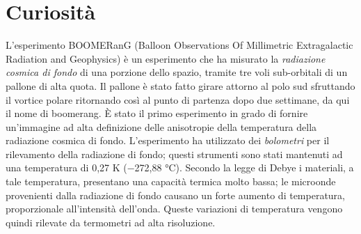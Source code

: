 \documentclass[12pt,a4paper]{article}
\begin{document}
\section*{Curiosità}
\label{curiosit}

L'esperimento BOOMERanG (Balloon Observations Of Millimetric Extragalactic Radiation and Geophysics) è un esperimento che ha misurato la \emph{radiazione cosmica di fondo} di una porzione dello spazio, tramite tre voli sub-orbitali di un pallone di alta quota. Il pallone è stato fatto girare attorno al polo sud sfruttando il vortice polare ritornando così al punto di partenza dopo due settimane, da qui il nome di boomerang.
È stato il primo esperimento in grado di fornire un'immagine ad alta definizione delle anisotropie della temperatura della radiazione cosmica di fondo. L'esperimento ha utilizzato dei \emph{bolometri} per il rilevamento della radiazione di fondo; questi strumenti sono stati mantenuti ad una temperatura di 0,27 K (−272,88 °C). Secondo la legge di Debye i materiali, a tale temperatura, presentano una capacità termica molto bassa; le microonde provenienti dalla radiazione di fondo causano un forte aumento di temperatura, proporzionale all'intensità dell'onda. Queste variazioni di temperatura vengono quindi rilevate da termometri ad alta risoluzione.
\end{document}
